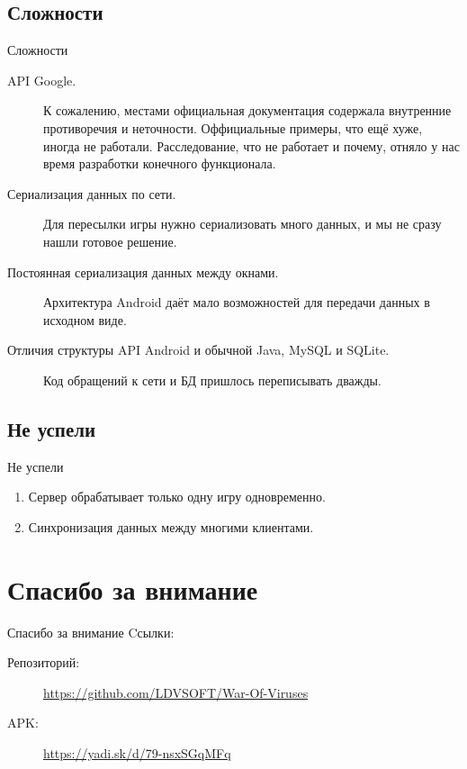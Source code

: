 \documentclass{beamer}
\begin{document}
\subsection{Сложности}
\begin{frame}[t]{Сложности}
	\begin{description}
		\item[API Google.]
			К сожалению, местами официальная документация содержала внутренние противоречия и неточности.
			Оффициальные примеры, что ещё хуже, иногда не работали.
			Расследование, что не работает и почему, отняло у нас время разработки конечного функционала.

		\item[Сериализация данных по сети.]
			Для пересылки игры нужно сериализовать много данных, и мы не сразу нашли готовое решение.

		\item[Постоянная сериализация данных между окнами.]
			Архитектура Android даёт мало возможностей для передачи данных в исходном виде.

		\item[Отличия структуры API Android и обычной Java, MySQL и SQLite.]
			Код обращений к сети и БД пришлось переписывать дважды.
	\end{description}
\end{frame}

\subsection{Не успели}
\begin{frame}[t]{Не успели}
	\begin{enumerate}
		\item Сервер обрабатывает только одну игру одновременно.
		\item Синхронизация данных между многими клиентами.
	\end{enumerate}
\end{frame}

\section{Спасибо за внимание}
\begin{frame}[t]{Спасибо за внимание}
	Cсылки:
	\begin{description}
		\item[Репозиторий:]	\url{https://github.com/LDVSOFT/War-Of-Viruses}
		\item[APK:] \url{https://yadi.sk/d/79-nsxSGqMFq}
	\end{description}
\end{frame}
\end{document}
